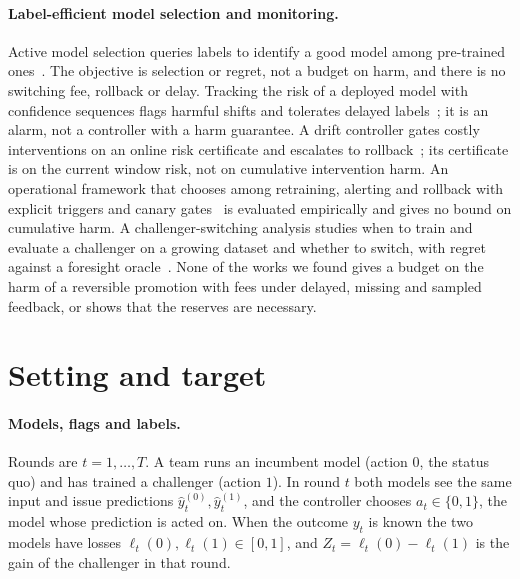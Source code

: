 \documentclass[10pt]{article}
\theoremstyle{plain}
\theoremstyle{definition}
\begin{document}
\paragraph{Label-efficient model selection and monitoring.}
Active model selection queries labels to identify a good model among pre-trained ones~\citep{karimi2021online,liu2024cams}. The objective is selection or regret, not a budget on harm, and there is no switching fee, rollback or delay. Tracking the risk of a deployed model with confidence sequences flags harmful shifts and tolerates delayed labels~\citep{podkopaev2022tracking}; it is an alarm, not a controller with a harm guarantee. A drift controller gates costly interventions on an online risk certificate and escalates to rollback~\citep{lamaakal2026drift2act}; its certificate is on the current window risk, not on cumulative intervention harm. An operational framework that chooses among retraining, alerting and rollback with explicit triggers and canary gates~\citep{sadeghian2026rar} is evaluated empirically and gives no bound on cumulative harm. A challenger-switching analysis studies when to train and evaluate a challenger on a growing dataset and whether to switch, with regret against a foresight oracle~\citep{digalakis2025challenger}. None of the works we found gives a budget on the harm of a reversible promotion with fees under delayed, missing and sampled feedback, or shows that the reserves are necessary.

\section{Setting and target}\label{sec:setting}
\paragraph{Models, flags and labels.}
Rounds are $t=1,\dots,T$. A team runs an incumbent model (action $0$, the status quo) and has trained a challenger (action $1$). In round $t$ both models see the same input and issue predictions $\hat y^{(0)}_t,\hat y^{(1)}_t$, and the controller chooses $a_t\in\{0,1\}$, the model whose prediction is acted on. When the outcome $y_t$ is known the two models have losses $\ell_t(0),\ell_t(1)\in[0,1]$, and $Z_t=\ell_t(0)-\ell_t(1)$ is the gain of the challenger in that round.
\end{document}
